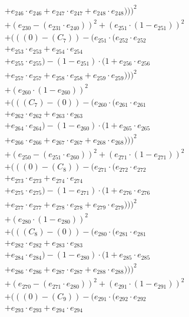 \documentclass[10pt, a4paper]{article}
\begin{document}
\begin{small}
\begin{align*}
& + e_{246} \cdot e_{246} + e_{247} \cdot e_{247} + e_{248} \cdot e_{248})))^{2} \\
& + (e_{230} - (e_{231} \cdot e_{240}))^{2} + (e_{251} \cdot (1 - e_{251}))^{2} \\
& + (((0) - (C_{7})) - (e_{251} \cdot (e_{252} \cdot e_{252} \\
& + e_{253} \cdot e_{253} + e_{254} \cdot e_{254} \\
& + e_{255} \cdot e_{255}) - (1 - e_{251}) \cdot (1 + e_{256} \cdot e_{256} \\
& + e_{257} \cdot e_{257} + e_{258} \cdot e_{258} + e_{259} \cdot e_{259})))^{2} \\
& + (e_{260} \cdot (1 - e_{260}))^{2} \\
& + (((C_{7}) - (0)) - (e_{260} \cdot (e_{261} \cdot e_{261} \\
& + e_{262} \cdot e_{262} + e_{263} \cdot e_{263} \\
& + e_{264} \cdot e_{264}) - (1 - e_{260}) \cdot (1 + e_{265} \cdot e_{265} \\
& + e_{266} \cdot e_{266} + e_{267} \cdot e_{267} + e_{268} \cdot e_{268})))^{2} \\
& + (e_{250} - (e_{251} \cdot e_{260}))^{2} + (e_{271} \cdot (1 - e_{271}))^{2} \\
& + (((0) - (C_{8})) - (e_{271} \cdot (e_{272} \cdot e_{272} \\
& + e_{273} \cdot e_{273} + e_{274} \cdot e_{274} \\
& + e_{275} \cdot e_{275}) - (1 - e_{271}) \cdot (1 + e_{276} \cdot e_{276} \\
& + e_{277} \cdot e_{277} + e_{278} \cdot e_{278} + e_{279} \cdot e_{279})))^{2} \\
& + (e_{280} \cdot (1 - e_{280}))^{2} \\
& + (((C_{8}) - (0)) - (e_{280} \cdot (e_{281} \cdot e_{281} \\
& + e_{282} \cdot e_{282} + e_{283} \cdot e_{283} \\
& + e_{284} \cdot e_{284}) - (1 - e_{280}) \cdot (1 + e_{285} \cdot e_{285} \\
& + e_{286} \cdot e_{286} + e_{287} \cdot e_{287} + e_{288} \cdot e_{288})))^{2} \\
& + (e_{270} - (e_{271} \cdot e_{280}))^{2} + (e_{291} \cdot (1 - e_{291}))^{2} \\
& + (((0) - (C_{9})) - (e_{291} \cdot (e_{292} \cdot e_{292} \\
& + e_{293} \cdot e_{293} + e_{294} \cdot e_{294} \\

\end{align*}
\end{small}
\end{document}
